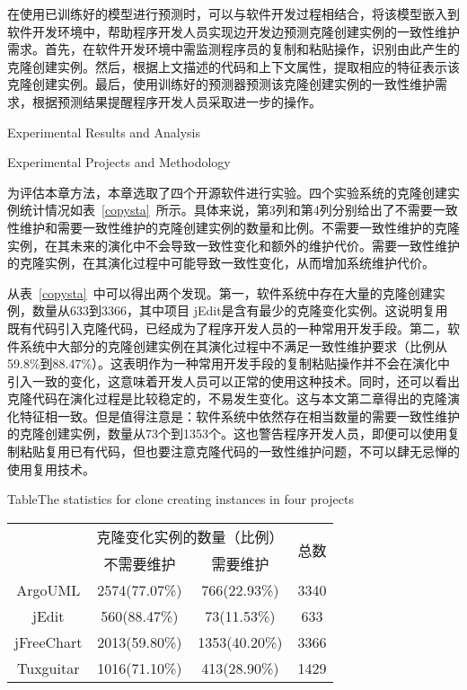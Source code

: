 在使用已训练好的模型进行预测时，可以与软件开发过程相结合，将该模型嵌入到软件开发环境中，帮助程序开发人员实现边开发边预测克隆创建实例的一致性维护需求。首先，在软件开发环境中需监测程序员的复制和粘贴操作，识别由此产生的克隆创建实例。然后，根据上文描述的代码和上下文属性，提取相应的特征表示该克隆创建实例。最后，使用训练好的预测器预测该克隆创建实例的一致性维护需求，根据预测结果提醒程序开发人员采取进一步的操作。


{Experimental Results and Analysis}


{Experimental Projects and Methodology}

为评估本章方法，本章选取了四个开源软件进行实验。四个实验系统的克隆创建实例统计情况如表~\ref{copysta}~所示。具体来说，第3列和第4列分别给出了不需要一致性维护和需要一致性维护的克隆创建实例的数量和比例。不需要一致性维护的克隆实例，在其未来的演化中不会导致一致性变化和额外的维护代价。需要一致性维护的克隆实例，在其演化过程中可能导致一致性变化，从而增加系统维护代价。

从表~\ref{copysta}~中可以得出两个发现。第一，软件系统中存在大量的克隆创建实例，数量从633到3366，其中项目 jEdit是含有最少的克隆变化实例。这说明复用既有代码引入克隆代码，已经成为了程序开发人员的一种常用开发手段。第二，软件系统中大部分的克隆创建实例在其演化过程中不满足一致性维护要求（比例从59.8\%到88.47\%）。这表明作为一种常用开发手段的复制粘贴操作并不会在演化中引入一致的变化，这意味着开发人员可以正常的使用这种技术。同时，还可以看出克隆代码在演化过程是比较稳定的，不易发生变化。这与本文第二章得出的克隆演化特征相一致。但是值得注意是：软件系统中依然存在相当数量的需要一致性维护的克隆创建实例，数量从73个到1353个。这也警告程序开发人员，即便可以使用复制粘贴复用已有代码，但也要注意克隆代码的一致性维护问题，不可以肆无忌惮的使用复用技术。

\begin{table}[htbp]
{Table$\!$}{The statistics for clone creating instances in four projects}
\vspace{0.5em}
\centering
\wuhao
\begin{tabular}{cccc}
\toprule[1.5pt]
~\multirow{2}{*}{实验系统}& \multicolumn{2}{c}{克隆变化实例的数量（比例）} & \multirow{2}{*}{总数}\\ 
 \cline{2-3}
~&{不需要维护} &{需要维护} & ~\\
\midrule[1pt]
ArgoUML&	2574(77.07\%)&	766(22.93\%)&	3340\\
jEdit&	560(88.47\%)&	73(11.53\%)&	633\\
jFreeChart&	2013(59.80\%)&	1353(40.20\%)&	3366\\
Tuxguitar&	1016(71.10\%)&	413(28.90\%)&	1429\\
\bottomrule[1.5pt]
\end{tabular}
\end{table}

